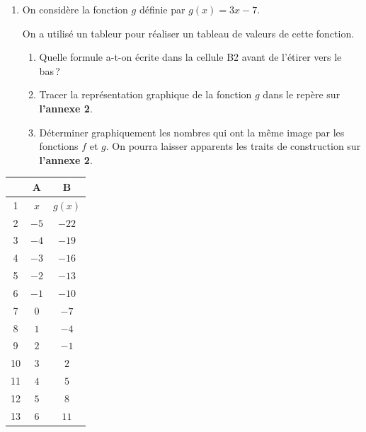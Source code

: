 \documentclass[a4paper,12pt]{article}
\begin{document}
\begin{minipage}[t]{10cm}
\begin{enumerate}[start=3]
\item On considère la fonction $g$ définie par $g(x) = 3x - 7$.

On a utilisé un tableur pour réaliser un tableau de valeurs de cette fonction.
  \begin{enumerate}[label=\alph*., itemsep=3pt]
    \item Quelle formule a-t-on écrite dans la cellule B2 avant de l'étirer vers le bas\,?
    \item Tracer la représentation graphique de la fonction $g$ dans le repère sur \textbf{l'annexe 2}.
    \item Déterminer graphiquement les nombres qui ont la même image par les fonctions $f$ et $g$. On pourra laisser apparents les traits de construction sur \textbf{l'annexe 2}.
  \end{enumerate}
\end{enumerate}
\end{minipage}\hfill
\begin{minipage}[t]{4.5cm}
\vspace{0pt}
\renewcommand{\arraystretch}{1.15}
\begin{center}
\begin{tabular}{|c|c|c|}
  \hline
     & A    & B       \\ \hline
  1  & $x$  & $g(x)$  \\ \hline
  2  & $-5$ & $-22$   \\ \hline
  3  & $-4$ & $-19$   \\ \hline
  4  & $-3$ & $-16$   \\ \hline
  5  & $-2$ & $-13$   \\ \hline
  6  & $-1$ & $-10$   \\ \hline
  7  & $0$  & $-7$    \\ \hline
  8  & $1$  & $-4$    \\ \hline
  9  & $2$  & $-1$    \\ \hline
  10 & $3$  & $2$     \\ \hline
  11 & $4$  & $5$     \\ \hline
  12 & $5$  & $8$     \\ \hline
  13 & $6$  & $11$    \\ \hline
\end{tabular}
\end{center}
\end{minipage}
\end{document}

